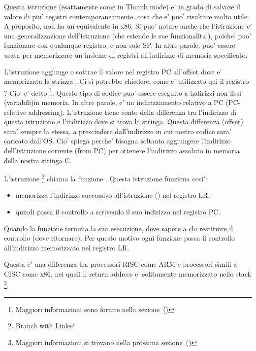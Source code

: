 Questa istruzione (esattamente come \PUSH in Thumb mode) e' in grado di salvare il valore di piu' registri contemporaneamente, cosa che e' puo' risultare molto utile. 
A proposito, non ha un equivalente in x86.
Si puo' notare anche che l'istruzione  e' una generalizzazione dell'istruzione \PUSH (che estende le sue funzionalita'), poiche' puo' funzionare con qualunque registro, e non solo \ac{SP}.
In altre parole,  puo' essere usata per memorizzare un insieme di registri all'indirizzo di memoria specificato.

\myindex{\PICcode}
L'istruzione 
aggiunge o sottrae il valore nel registro \ac{PC} all'offset dove e' memorizzata la stringa .
Ci si potrebbe chiedere, come e' utilizzato qui il registro ?
Cio' e' detto \q{\PICcode}
\footnote{Maggiori informazioni sono fornite nella sezione~()}.
Questo tipo di codice puo' essere eseguito a indirizzi non fissi (variabili)in memoria.
In altre parole, e' un indirizzamento relativo a \ac{PC} (\ac{PC}-relative addressing).
L'istruzione  tiene conto della differenza tra l'indirizzo di questa istruzione e l'indirizzo dove si trova la stringa.
Questa differenza (offset) sara' sempre la stessa, a prescindere dall'indirizzo in cui nostro codice sara' caricato dall'\ac{OS}.
Cio' spiega perche' bisogna soltanto aggiungere l'indirizzo dell'istruzione corrente (from \ac{PC}) per ottenere l'indirizzo assoluto in memoria della nostra stringa C.

L'istruzione \footnote{Branch with Link} chiama la funzione \printf. 
Questa istruzione funziona cosi': 
\begin{itemize}
\item memorizza l'indirizzo successivo all'istruzione  () nel registro \ac{LR};
\item quindi passa il controllo a \printf scrivendo il suo indirizzo nel registro \ac{PC}.
\end{itemize}

Quando la funzione \printf termina la sua esecuzione, deve sapere a chi restituire il controllo (dove ritornare). Per questo motivo ogni funzione passa il controllo all'indirizzo memorizzato nel registro \ac{LR}.

Questa e' una differenza tra processori \ac{RISC}  come ARM e processori simili a \ac{CISC} come x86, nei quali il return address e' solitamente memorizzato nello stack
\footnote{Maggiori informazioni si trovano nella prossima sezione~()}.

